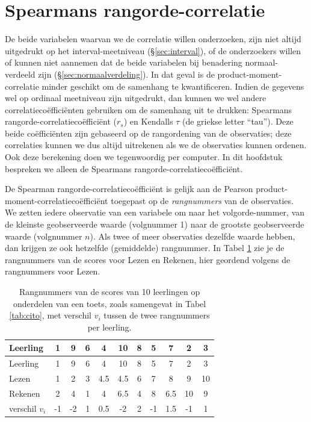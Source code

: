 \documentclass[
]{book}
\begin{document}
\hypertarget{sec:Spearman}{%
\section{Spearmans rangorde-correlatie}\label{sec:Spearman}}

De beide variabelen waarvan we de correlatie willen onderzoeken, zijn
niet altijd uitgedrukt op het interval-meetniveau
(§\ref{sec:interval}), of de onderzoekers willen of kunnen niet aannemen dat
de beide variabelen bij benadering normaal-verdeeld zijn
(§\ref{sec:normaalverdeling}).
In dat geval is de
product-moment-correlatie minder geschikt om de samenhang te
kwantificeren. Indien de gegevens wel op ordinaal meetniveau zijn
uitgedrukt, dan kunnen we wel andere correlatiecoëfficiënten gebruiken
om de samenhang uit te drukken: Spearmans rangorde-correlatiecoëfficiënt
(\(r_s\)) en Kendalls \(\tau\) (de griekse letter ``tau''). Deze beide
coëfficiënten zijn gebaseerd op de rangordening van de observaties; deze
correlaties kunnen we dus altijd uitrekenen als we de observaties kunnen
ordenen. Ook deze berekening doen we tegenwoordig per computer. In dit
hoofdstuk bespreken we alleen de Spearmans
rangorde-correlatiecoëfficiënt.

De Spearman rangorde-correlatiecoëfficiënt is gelijk aan de Pearson
product-moment-correlatiecoëfficiënt toegepast op de \emph{rangnummers} van de
observaties. We zetten iedere observatie van een variabele om naar het
volgorde-nummer, van de kleinste geobserveerde waarde (volgnummer 1)
naar de grootste geobserveerde waarde (volgnummer \(n\)). Als twee of meer
observaties dezelfde waarde hebben, dan krijgen ze ook hetzelfde
(gemiddelde) rangnummer. In
Tabel \ref{tab:cito-rangnummers} zie je de rangnummers van de scores
voor Lezen en Rekenen, hier geordend volgens de rangnummers voor Lezen.

\begin{longtable}[]{@{}lcccccccccc@{}}
\caption{\label{tab:cito-rangnummers} Rangnummers van de scores van 10 leerlingen op onderdelen van een toets, zoals samengevat in Tabel \ref{tab:cito}, met verschil \(v_i\) tussen de twee rangnummers per leerling.}\tabularnewline
\toprule
Leerling & 1 & 9 & 6 & 4 & 10 & 8 & 5 & 7 & 2 & 3\tabularnewline
\midrule
\endfirsthead
\toprule
Leerling & 1 & 9 & 6 & 4 & 10 & 8 & 5 & 7 & 2 & 3\tabularnewline
\midrule
\endhead
Lezen & 1 & 2 & 3 & 4.5 & 4.5 & 6 & 7 & 8 & 9 & 10\tabularnewline
Rekenen & 2 & 4 & 1 & 4 & 6.5 & 4 & 8 & 6.5 & 10 & 9\tabularnewline
verschil \(v_i\) & -1 & -2 & 1 & 0.5 & -2 & 2 & -1 & 1.5 & -1 & 1\tabularnewline
\bottomrule
\end{longtable}
\end{document}
